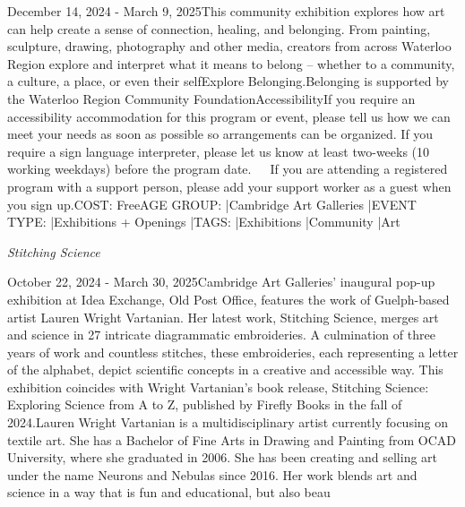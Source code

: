 \documentclass[letterpaper, 10pt]{article}
\newcommand{\subtitle}[1]{\textit{\large #1}\vspace{0.5em}}
\newcommand{\articlecontent}[1]{\small #1\vspace{1em}}
\begin{document}
\begin{multicols}{2}
{
\vspace{10px}

December 14, 2024 - March 9, 2025This community exhibition explores how art can help create a sense of connection, healing, and belonging. From painting, sculpture, drawing, photography and other media, creators from across Waterloo Region explore and interpret what it means to belong – whether to a community, a culture, a place, or even their selfExplore Belonging.Belonging is supported by the Waterloo Region Community FoundationAccessibilityIf you require an accessibility accommodation for this program or event, please tell us how we can meet your needs as soon as possible so arrangements can be organized. If you require a sign language interpreter, please let us know at least two-weeks (10 working weekdays) before the program date.   If you are attending a registered program with a support person, please add your support worker as a guest when you sign up.COST: FreeAGE GROUP: |Cambridge Art Galleries |EVENT TYPE: |Exhibitions + Openings |TAGS: |Exhibitions |Community |Art
}
\vspace{10px}

\subtitle{Stitching Science}

\articlecontent{

\qrcode[height=1.5cm]{https://ideaexchange.libnet.info/event/12111005}
\vspace{10px}

October 22, 2024 - March 30, 2025Cambridge Art Galleries' inaugural pop-up exhibition at Idea Exchange, Old Post Office, features the work of Guelph-based artist Lauren Wright Vartanian. Her latest work, Stitching Science, merges art and science in 27 intricate diagrammatic embroideries. A culmination of three years of work and countless stitches, these embroideries, each representing a letter of the alphabet, depict scientific concepts in a creative and accessible way. This exhibition coincides with Wright Vartanian’s book release, Stitching Science: Exploring Science from A to Z, published by Firefly Books in the fall of 2024.Lauren Wright Vartanian is a multidisciplinary artist currently focusing on textile art. She has a Bachelor of Fine Arts in Drawing and Painting from OCAD University, where she graduated in 2006. She has been creating and selling art under the name Neurons and Nebulas since 2016. Her work blends art and science in a way that is fun and educational, but also beau
}
\vspace{10px}


\end{multicols}
\end{document}
